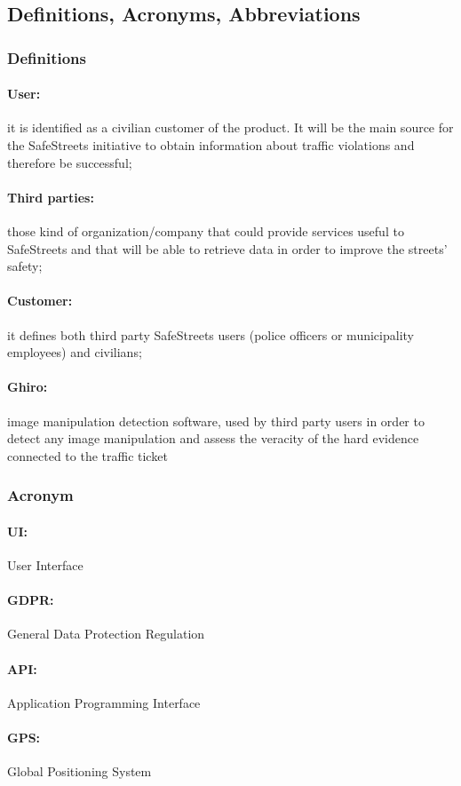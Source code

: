 \documentclass{article}
\begin{document}
\subsection{Definitions, Acronyms, Abbreviations}
\subsubsection{Definitions}
\paragraph{User:} it is identified as a civilian customer of the product. It
will be the main source for the SafeStreets initiative to obtain information
about traffic violations and therefore be successful; \paragraph{Third
parties:}those kind of organization/company that could provide services useful
to SafeStreets and that will be able to retrieve data in order to improve the
streets' safety; \paragraph{Customer:} it defines both third party SafeStreets
users (police officers or municipality employees) and civilians; \paragraph{Ghiro:} image
manipulation detection software, used by third party users in order to detect
any image manipulation and assess the veracity of the hard evidence connected to
the traffic ticket
\subsubsection{Acronym}
\paragraph{UI:} User Interface \paragraph{GDPR:} General Data Protection
Regulation \paragraph{API:} Application Programming Interface \paragraph{GPS:}
Global Positioning System
\end{document}
